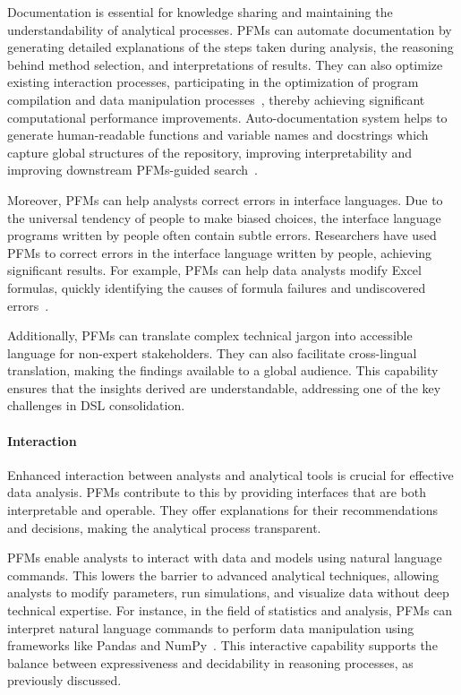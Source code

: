   Documentation is essential for knowledge sharing and maintaining the understandability of analytical processes. PFMs can automate documentation by generating detailed explanations of the steps taken during analysis, the reasoning behind method selection, and interpretations of results. They can also optimize existing interaction processes, participating in the optimization of program compilation and data manipulation processes~\cite{cummins2023large, cummins2024meta, li2024can}, thereby achieving significant computational performance improvements. Auto-documentation system helps to generate human-readable functions and variable names and docstrings which capture global structures of the repository, improving interpretability and improving downstream PFMs-guided search~\cite{GrandWBOLTA24}.
  
  Moreover, PFMs can help analysts correct errors in interface languages. Due to the universal tendency of people to make biased choices, the interface language programs written by people often contain subtle errors. Researchers have used PFMs to correct errors in the interface language written by people, achieving significant results. For example, PFMs can help data analysts modify Excel formulas, quickly identifying the causes of formula failures and undiscovered errors~\cite{Bavishi2022NeurosymbolicRF}.
  
  Additionally, PFMs can translate complex technical jargon into accessible language for non-expert stakeholders. They can also facilitate cross-lingual translation, making the findings available to a global audience. This capability ensures that the insights derived are understandable, addressing one of the key challenges in DSL consolidation.
  
  \paragraph{Interaction}
  
  Enhanced interaction between analysts and analytical tools is crucial for effective data analysis. PFMs contribute to this by providing interfaces that are both interpretable and operable. They offer explanations for their recommendations and decisions, making the analytical process transparent.
  
  PFMs enable analysts to interact with data and models using natural language commands. This lowers the barrier to advanced analytical techniques, allowing analysts to modify parameters, run simulations, and visualize data without deep technical expertise. For instance, in the field of statistics and analysis, PFMs can interpret natural language commands to perform data manipulation using frameworks like Pandas and NumPy~\cite{lai2023ds}. This interactive capability supports the balance between expressiveness and decidability in reasoning processes, as previously discussed.
  
